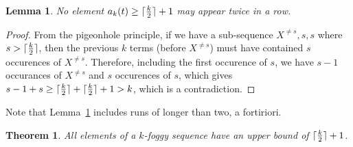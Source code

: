\documentclass{article}
\DeclarePairedDelimiter\ceil{\lceil}{\rceil}
\newtheorem{theorem}{Theorem}
\newtheorem{lemma}{Lemma}
\begin{document}
\begin{lemma}\label{lem:twiceInARow}
No element $a_k(t) \geq \ceil{\frac{k}{2}}+1$ may appear twice in a row.
\end{lemma}

\begin{proof}
From the pigeonhole principle, if we have a sub-sequence $X^{\neq s},s,s$ where $s>\ceil{\frac{k}{2}}$, then the previous $k$ terms (before $X^{\neq s}$) must have contained $s$ occurences of $X^{\neq s}$. Therefore, including the first occurence of $s$, we have $s-1$ occurances of $X^{\neq s}$ and $s$ occurences of $s$, which gives $s-1+s \geq \ceil{\frac{k}{2}}+\ceil{\frac{k}{2}}+1 > k$, which is a contradiction.
\end{proof}

Note that Lemma~\ref{lem:twiceInARow} includes runs of longer than two, a fortiriori. 

\begin{theorem}\label{thm:elementUpperBound}
All elements of a $k$-foggy sequence have an upper bound of $\ceil{\frac{k}{2}}+1$.
\end{theorem}
\end{document}
